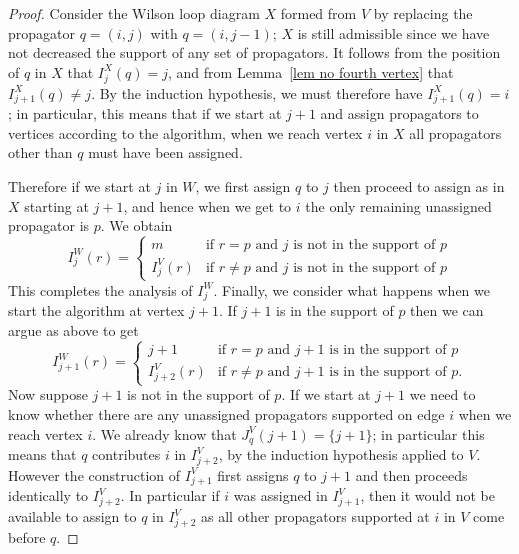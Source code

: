 \documentclass[11pt]{article}
\theoremstyle{remark}
\theoremstyle{definition}
\begin{document}
\begin{proof}
Consider the Wilson loop diagram $X$ formed from $V$ by replacing the propagator $q = (i,j)$ with $q = (i, j-1)$;  $X$ is still admissible since we have not decreased the support of any set of propagators. 
It follows from the position of $q$ in $X$ that $I_j^X(q) = j$, and from Lemma~\ref{lem no fourth vertex} that $I_{j+1}^X(q) \neq j$. By the induction hypothesis, we must therefore have $I_{j+1}^X(q) = i$; in particular, this means that if we start at $j+1$ and assign propagators to vertices according to the algorithm, when we reach vertex $i$ in $X$ all propagators other than $q$ must have been assigned.

Therefore if we start at $j$ in $W$, we first assign $q$ to $j$ then proceed to assign as in $X$ starting at $j+1$, and hence when we get to $i$ the only remaining unassigned propagator is $p$. We obtain
       \[
       I_j^{W}(r) = \begin{cases}

       m & \text{if $r =p$ and $j$ is not in the support of $p$} \\
       I_{j}^{V}(r) & \text{if $r\neq p$ and $j$ is not in the support of $p$}\end{cases}
       \] 
This completes the analysis of $I_j^W$. Finally, we consider what happens when we start the algorithm at vertex $j+1$. If $j+1$ is in the support of $p$ then we can argue as above to get
\[
       I_{j+1}^{W}(r)  = \begin{cases}
         j+1 & \text{if $r=p$ and $j+1$ is in the support of $p$}\\
         I_{j+2}^{V}(r) & \text{if $r\neq p$ and $j+1$ is in the support of $p$}.
       \end{cases}
       \]
Now suppose $j+1$ is not in the support of $p$. If we start at $j+1$ we need to know whether there are any unassigned propagators supported on edge $i$ when we reach vertex $i$. We already know that $J_q^{V}(j+1) = \{j+1\}$; in particular this means that $q$ contributes $i$ in $I_{j+2}^{V}$, by the induction hypothesis applied to $V$. However the construction of $I^{V}_{j+1}$ first assigns $q$ to $j+1$ and then proceeds identically to $I^{V}_{j+2}$.  In particular if $i$ was assigned in $I^{V}_{j+1}$, then it would not be available to assign to $q$ in $I^{V}_{j+2}$ as all other propagators supported at $i$ in $V$ come before $q$. 


\end{proof}
\end{document}
